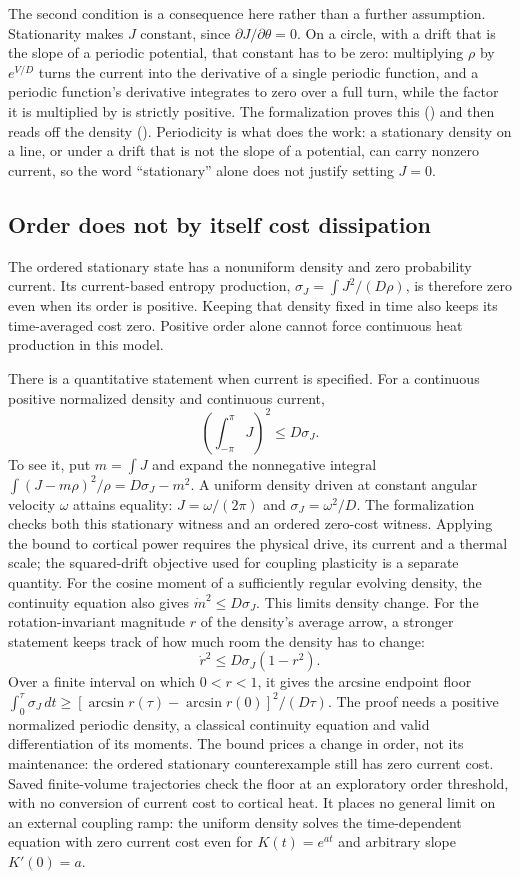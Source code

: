 \documentclass[11pt]{article}
\newcommand{\id}[1]{{\small\ttfamily\seqsplit{#1}}}
\begin{document}
The second condition is a consequence here rather than a further assumption.
Stationarity makes $J$ constant, since $\partial J/\partial\theta=0$. On a
circle, with a drift that is the slope of a periodic potential, that constant
has to be zero: multiplying $\rho$ by $e^{V/D}$ turns the current into the
derivative of a single periodic function, and a periodic function's derivative
integrates to zero over a full turn, while the factor it is multiplied by is
strictly positive. The formalization proves this
(\id{stationary\_current\_zero}) and then reads off the density
(\id{stationary\_iff\_vonMises}). Periodicity is what does the work: a
stationary density on a line, or under a drift that is not the slope of a
potential, can carry nonzero current, so the word ``stationary'' alone does not
justify setting $J=0$.

\subsection{Order does not by itself cost dissipation}

The ordered stationary state has a nonuniform density and zero probability
current. Its current-based entropy production,
$\sigma_J=\int J^2/(D\rho)$, is therefore zero even when its order is positive.
Keeping that density fixed in time also keeps its time-averaged cost zero.
Positive order alone cannot force continuous heat production in this model.

There is a quantitative statement when current is specified. For a continuous
positive normalized density and continuous current,
\[
 \left(\int_{-\pi}^{\pi}J\right)^2\leq D\sigma_J.
\]
To see it, put $m=\int J$ and expand the nonnegative integral
$\int(J-m\rho)^2/\rho=D\sigma_J-m^2$.
A uniform density driven at constant angular velocity $\omega$ attains equality:
$J=\omega/(2\pi)$ and $\sigma_J=\omega^2/D$. The formalization checks both
this stationary witness and an ordered zero-cost witness. Applying the bound
to cortical power requires the physical drive, its current and a thermal scale;
the squared-drift objective used for coupling plasticity is a separate quantity.
For the cosine moment of a sufficiently regular evolving density, the continuity
equation also gives $\dot m^2\leq D\sigma_J$. This limits density change.
For the rotation-invariant magnitude $r$ of the density's average arrow, a
stronger statement keeps track of how much room the density has to change:
\[
 \dot r^2\leq D\sigma_J(1-r^2).
\]
Over a finite interval on which $0<r<1$, it gives the arcsine endpoint floor
$\int_0^\tau\sigma_J\,dt\geq
[\arcsin r(\tau)-\arcsin r(0)]^2/(D\tau)$.
The proof needs a positive normalized periodic density, a classical
continuity equation and valid differentiation of its moments. The bound
prices a change in order, not its maintenance: the ordered stationary
counterexample still has zero current cost. Saved finite-volume trajectories
check the floor at an exploratory order threshold, with no conversion of
current cost to cortical heat.
It places no general limit on an external coupling ramp: the uniform density
solves the time-dependent equation with zero current cost even for
$K(t)=e^{at}$ and arbitrary slope $K'(0)=a$.
\end{document}
